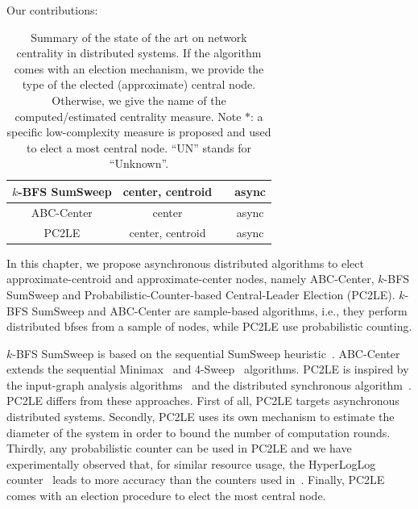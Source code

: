 {\begin{table}[!t]
		{\small\hspace{3em} Our contributions:}
		\begin{center}
			\small
			\begin{tabular}
				{|C{\lenFour}|C{\lenFour}|C{\lenFive}|C{\lenOne}|}
				\hline
				$k$-BFS SumSweep & center, centroid & \SPSN{} & async \\
				\hline
				ABC-Center & center & \SPSN{} & async \\
				\hline	
				PC2LE & center, centroid & \PCM{} & async \\
				\hline
			\end{tabular}
		\end{center}
		\caption{Summary of the state of the art on network centrality in distributed systems. If the algorithm comes with an election mechanism, we provide the type of the elected (approximate) central node. Otherwise, we give the name of the computed/estimated centrality measure. Note $*$: a specific low-complexity measure is proposed and used to elect a most central node. ``UN'' stands for ``Unknown''.\label{table:centrality:related-work}}
	\end{table}
}

In this chapter, we propose asynchronous distributed algorithms to elect approximate-centroid and approximate-center nodes, namely ABC-Center, $k$-BFS SumSweep and Probabilistic-Counter-based Central-Leader Election (PC2LE). $k$-BFS SumSweep and ABC-Center are sample-based algorithms, i.e., they perform distributed \gls{bfses} from a sample of nodes, while PC2LE use probabilistic counting. 

$k$-BFS SumSweep is based on the sequential  SumSweep heuristic~\cite{borassi2014solvability}. ABC-Center extends the sequential Minimax~\cite{handler1973minimax} and 4-Sweep~\cite{crescenzi2013computing} algorithms. PC2LE is inspired by the input-graph analysis algorithms~\cite{kang2011centralities,kang2011hadi} and the distributed synchronous algorithm~\cite{garin2012distributed}. PC2LE differs from these approaches. First of all, PC2LE targets asynchronous distributed systems. Secondly, PC2LE uses its own mechanism to estimate the diameter of the system in order to bound the number of computation rounds. Thirdly, any probabilistic counter can be used in PC2LE and we have experimentally observed that, for similar resource usage, the HyperLogLog counter~\cite{flajolet2007hyperloglog} leads to more accuracy than the counters used in~\cite{kang2011centralities,kang2011hadi,garin2012distributed}. Finally, PC2LE comes with an election procedure to elect the most central node.

